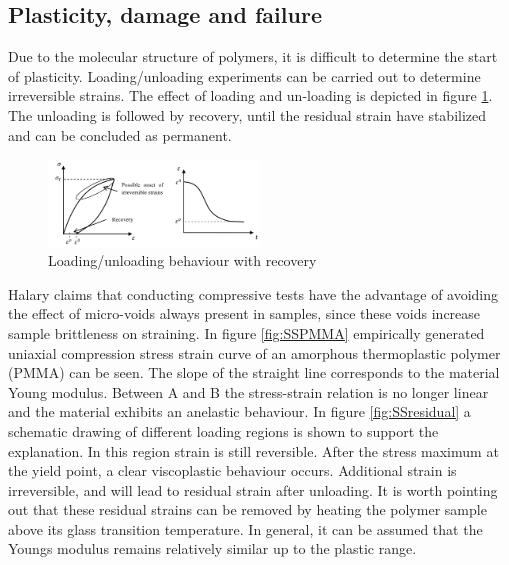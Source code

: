 \subsection{Plasticity, damage and failure}
Due to the molecular structure of polymers, it is difficult to determine the start of plasticity. Loading/unloading experiments can be carried out to determine irreversible strains.  The effect of loading and un-loading is depicted in figure \ref{fig:Irr}. The unloading is followed by recovery, until the residual strain have stabilized and can be concluded as permanent.
\begin{figure}[H]
    \centering
    \includegraphics[width=0.5\textwidth]{chapter_2/figures/Irr.PNG}
    \caption{Loading/unloading behaviour with recovery \cite{Appelsved2012InvestigationModels}}
    \label{fig:Irr}
\end{figure}
Halary \cite{Halary2011PolymerMaterials} claims that conducting compressive tests have the advantage of avoiding the effect of micro-voids always present in samples, since these voids increase sample brittleness on straining. In figure \ref{fig:SSPMMA} empirically generated uniaxial compression stress strain curve of an amorphous thermoplastic polymer (PMMA) can be seen. The slope of the straight line corresponds to the material Young modulus. Between A and B the stress-strain relation is no longer linear and the material exhibits an anelastic behaviour. In figure \ref{fig:SSresidual} a schematic drawing of different loading regions is shown to support the explanation. In this region strain is still reversible. After the stress maximum at the yield point, a clear viscoplastic behaviour occurs. Additional strain is irreversible, and will lead to residual strain after unloading. It is worth pointing out that these residual strains can be removed by heating the polymer sample above its glass transition temperature. In general, it can be assumed that the Youngs modulus remains relatively similar up to the plastic range. 

